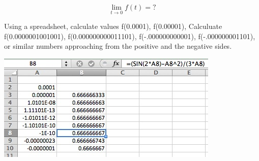 \documentclass{ximera}
\author{Emma Smith Zbarsky}
\begin{document}
\begin{exercise}

\[\lim_{t\to 0} f(t) = ?\]


\begin{hint}
Using a spreadsheet, calculate values f(0.0001), f(0.00001), Calculuate
f(0.0000001001001), f(0.000000000011101), f(-.000000000001),
f(-.000000001101), or similar numbers approaching from the positive and
the negative sides.
\end{hint}


\begin{hint}
\begin{image}\includegraphics{numerical-limit-cal.jpg}\end{image}
\end{hint}


\begin{multipleChoice}
\choice{$\infty$}
\end{multipleChoice}

\end{exercise}
\end{document}
